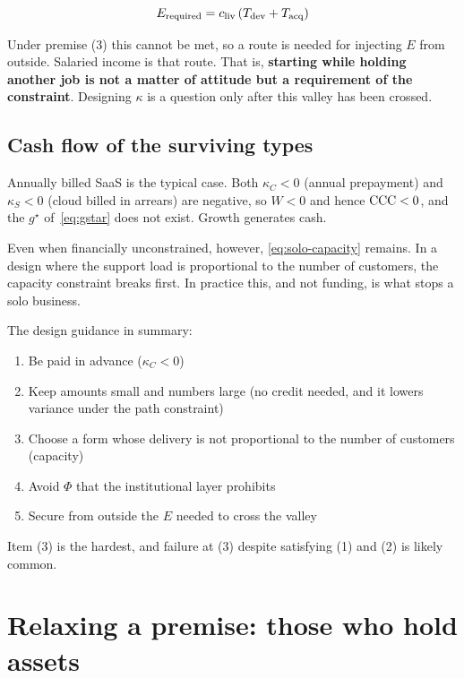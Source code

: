 \begin{equation}
E_{\rm required} = c_{\rm liv}\,(T_{\rm dev} + T_{\rm acq})
\label{eq:E-required}
\end{equation}

Under premise (3) this cannot be met, so a route is needed for injecting $E$ from outside.
Salaried income is that route. That is, \textbf{starting while holding another job is not a
matter of attitude but a requirement of the constraint}. Designing $\kappa$ is a question
only after this valley has been crossed.

\subsection{Cash flow of the surviving types}

Annually billed SaaS is the typical case. Both $\kappa_C<0$ (annual prepayment) and
$\kappa_S<0$ (cloud billed in arrears) are negative, so $W<0$ and hence $\mathrm{CCC}<0$, and the
$g^\star$ of~\eqref{eq:gstar} does not exist. Growth generates cash.

Even when financially unconstrained, however, \eqref{eq:solo-capacity} remains. In a design
where the support load is proportional to the number of customers, the capacity constraint
breaks first. In practice this, and not funding, is what stops a solo business.

The design guidance in summary:

\begin{enumerate}[label=(\arabic*)]
\item Be paid in advance ($\kappa_C<0$)
\item Keep amounts small and numbers large (no credit needed, and it lowers variance under the path constraint)
\item Choose a form whose delivery is not proportional to the number of customers (capacity)
\item Avoid $\Phi$ that the institutional layer prohibits
\item Secure from outside the $E$ needed to cross the valley
\end{enumerate}

Item (3) is the hardest, and failure at (3) despite satisfying (1) and (2) is likely common.

\section{Relaxing a premise: those who hold assets}
\label{sec:retiree}

